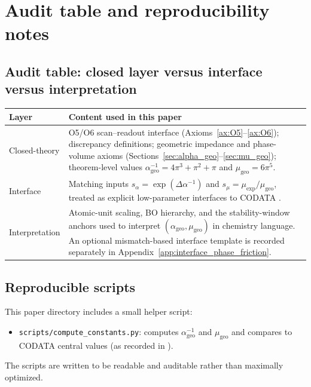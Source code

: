 \section{Audit table and reproducibility notes}
\label{app:audit}

\subsection{Audit table: closed layer versus interface versus interpretation}
\begin{center}
\begin{tabular}{@{}p{}p{}@{}}
\toprule
Layer & Content used in this paper \\
\midrule
Closed-theory &
O5/O6 scan--readout interface (Axioms~\ref{ax:O5}--\ref{ax:O6}); discrepancy definitions; geometric impedance and phase-volume axioms (Sections~\ref{sec:alpha_geo}--\ref{sec:mu_geo}); theorem-level values $\alpha_{\mathrm{geo}}^{-1}=4\pi^3+\pi^2+\pi$ and $\mu_{\mathrm{geo}}=6\pi^5$. \\
\addlinespace
Interface &
Matching inputs $s_\alpha=\exp(\Delta\alpha^{-1})$ and $s_\mu=\mu_{\mathrm{exp}}/\mu_{\mathrm{geo}}$, treated as explicit low-parameter interfaces to CODATA \cite{CODATA2022RMP,Ma2025PCG}. \\
\addlinespace
Interpretation &
Atomic-unit scaling, BO hierarchy, and the stability-window anchors used to interpret $(\alpha_{\mathrm{geo}},\mu_{\mathrm{geo}})$ in chemistry language. An optional mismatch-based interface template is recorded separately in Appendix~\ref{app:interface_phase_friction}. \\
\bottomrule
\end{tabular}
\end{center}

\subsection{Reproducible scripts}
This paper directory includes a small helper script:
\begin{itemize}
\item \texttt{scripts/compute\_constants.py}: computes $\alpha_{\mathrm{geo}}^{-1}$ and $\mu_{\mathrm{geo}}$ and compares to CODATA central values (as recorded in \cite{Ma2025PCG}).
\end{itemize}
The scripts are written to be readable and auditable rather than maximally optimized.


